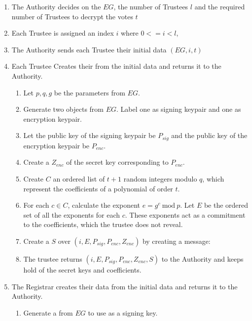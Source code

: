 \begin{enumerate}
    \item The Authority decides on the  $EG$, the number of Trustees $l$ and the required number of Trustees to decrypt the votes $t$
    \item Each Trustee is assigned an index $i$ where $0 <= i < l$,
    \item The Authority sends each Trustee their initial data $(EG, i, t)$
    \item Each Trustee Creates their  from the initial data and returns it to the Authority.
          \begin{enumerate}
              \item Let $p,q,g$ be the parameters from $EG$.
              \item Generate two  objects from $EG$. Label one as signing keypair and one as encryption keypair.
              \item Let the public key of the signing keypair be $P_{sig}$ and the public key of the encryption keypair be $P_{enc}$.
              \item Create a  $Z_{enc}$ of the secret key corresponding to $P_{enc}$.
              \item Create $C$ an ordered list of $t + 1$ random integers modulo $q$, which represent the coefficients of a polynomial of order $t$.
              \item For each $c \in C$, calculate the exponent $e = g^c\ \textrm{mod}\ p$. Let $E$ be the ordered set of all the exponents for each $c$. These exponents act as a commitment to the coefficients, which the trustee does not reveal.
              \item Create a  $S$ over $(i, E, P_{sig}, P_{enc}, Z_{enc})$ by creating a message: 
              \item The trustee returns $(i, E, P_{sig}, P_{enc}, Z_{enc}, S)$ to the Authority and keeps hold of the secret keys and coefficients.
          \end{enumerate}
    \item The Registrar creates their  data from the initial data and returns it to the Authority.
          \begin{enumerate}
              \item Generate a  from $EG$ to use as a signing key.

\end{enumerate}
\end{enumerate}
